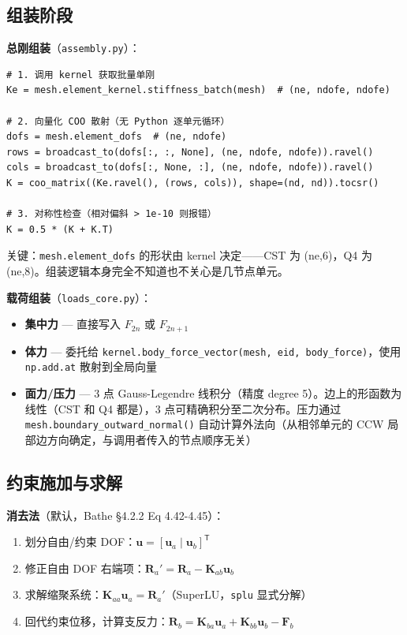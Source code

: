 \documentclass[12pt,a4paper]{ctexart}
\begin{document}
\subsection{组装阶段}

\textbf{总刚组装}（\texttt{assembly.py}）：

\begin{lstlisting}
# 1. 调用 kernel 获取批量单刚
Ke = mesh.element_kernel.stiffness_batch(mesh)  # (ne, ndofe, ndofe)

# 2. 向量化 COO 散射（无 Python 逐单元循环）
dofs = mesh.element_dofs  # (ne, ndofe)
rows = broadcast_to(dofs[:, :, None], (ne, ndofe, ndofe)).ravel()
cols = broadcast_to(dofs[:, None, :], (ne, ndofe, ndofe)).ravel()
K = coo_matrix((Ke.ravel(), (rows, cols)), shape=(nd, nd)).tocsr()

# 3. 对称性检查（相对偏斜 > 1e-10 则报错）
K = 0.5 * (K + K.T)
\end{lstlisting}

关键：\texttt{mesh.element\_dofs} 的形状由 kernel 决定——CST 为 (ne,6)，Q4 为 (ne,8)。组装逻辑本身完全不知道也不关心是几节点单元。

\textbf{载荷组装}（\texttt{loads\_core.py}）：

\begin{itemize}
  \item \textbf{集中力} — 直接写入 $F_{2n}$ 或 $F_{2n+1}$
  \item \textbf{体力} — 委托给 \texttt{kernel.body\_force\_vector(mesh, eid, body\_force)}，使用 \texttt{np.add.at} 散射到全局向量
  \item \textbf{面力/压力} — 3 点 Gauss-Legendre 线积分（精度 degree 5）。边上的形函数为线性（CST 和 Q4 都是），3 点可精确积分至二次分布。压力通过 \texttt{mesh.boundary\_outward\_normal()} 自动计算外法向（从相邻单元的 CCW 局部边方向确定，与调用者传入的节点顺序无关）
\end{itemize}

\subsection{约束施加与求解}

\textbf{消去法}（默认，Bathe \S4.2.2 Eq 4.42-4.45）：

\begin{enumerate}[leftmargin=*]
  \item 划分自由/约束 DOF：$\mathbf{u} = [\mathbf{u}_a \mid \mathbf{u}_b]^{\mathsf T}$
  \item 修正自由 DOF 右端项：$\mathbf{R}_a' = \mathbf{R}_a - \mathbf{K}_{ab}\mathbf{u}_b$
  \item 求解缩聚系统：$\mathbf{K}_{aa}\mathbf{u}_a = \mathbf{R}_a'$（SuperLU，\texttt{splu} 显式分解）
  \item 回代约束位移，计算支反力：$\mathbf{R}_b = \mathbf{K}_{ba}\mathbf{u}_a + \mathbf{K}_{bb}\mathbf{u}_b - \mathbf{F}_b$
\end{enumerate}
\end{document}

